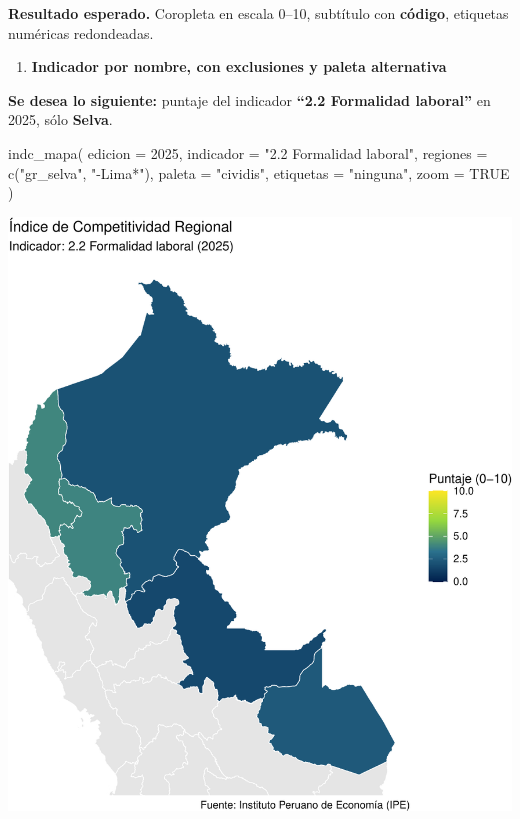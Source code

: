 \documentclass[
  11pt,
  letterpaper,
  DIV=11,
  numbers=noendperiod]{scrartcl}
\newenvironment{Shaded}{\begin{snugshade}}{\end{snugshade}}
\newcommand{\AttributeTok}[1]{\textcolor[rgb]{0.40,0.45,0.13}{#1}}
\newcommand{\ConstantTok}[1]{\textcolor[rgb]{0.56,0.35,0.01}{#1}}
\newcommand{\DecValTok}[1]{\textcolor[rgb]{0.68,0.00,0.00}{#1}}
\newcommand{\FunctionTok}[1]{\textcolor[rgb]{0.28,0.35,0.67}{#1}}
\newcommand{\NormalTok}[1]{\textcolor[rgb]{0.00,0.23,0.31}{#1}}
\newcommand{\StringTok}[1]{\textcolor[rgb]{0.13,0.47,0.30}{#1}}
\providecommand{\tightlist}{%
  \setlength{\itemsep}{0pt}\setlength{\parskip}{0pt}}\usepackage{longtable,booktabs,array}
\begin{document}
\textbf{Resultado esperado.} Coropleta en escala 0--10, subtítulo con
\textbf{código}, etiquetas numéricas redondeadas.

\begin{enumerate}
\def\labelenumi{\arabic{enumi}.}
\setcounter{enumi}{1}
\tightlist
\item
  \textbf{Indicador por nombre, con exclusiones y paleta alternativa}
\end{enumerate}

\textbf{Se desea lo siguiente:} puntaje del indicador \textbf{``2.2
Formalidad laboral''} en 2025, sólo \textbf{Selva}.

\begin{Shaded}
\begin{Highlighting}[]
\FunctionTok{indc\_mapa}\NormalTok{(}
  \AttributeTok{edicion   =} \DecValTok{2025}\NormalTok{,}
  \AttributeTok{indicador =} \StringTok{"2.2 Formalidad laboral"}\NormalTok{,}
  \AttributeTok{regiones  =} \FunctionTok{c}\NormalTok{(}\StringTok{"gr\_selva"}\NormalTok{, }\StringTok{"{-}Lima*"}\NormalTok{),}
  \AttributeTok{paleta    =} \StringTok{"cividis"}\NormalTok{,}
  \AttributeTok{etiquetas =} \StringTok{"ninguna"}\NormalTok{,}
  \AttributeTok{zoom      =} \ConstantTok{TRUE}
\NormalTok{)}
\end{Highlighting}
\end{Shaded}

\includegraphics{Manual_files/figure-pdf/unnamed-chunk-87-1.pdf}
\end{document}
